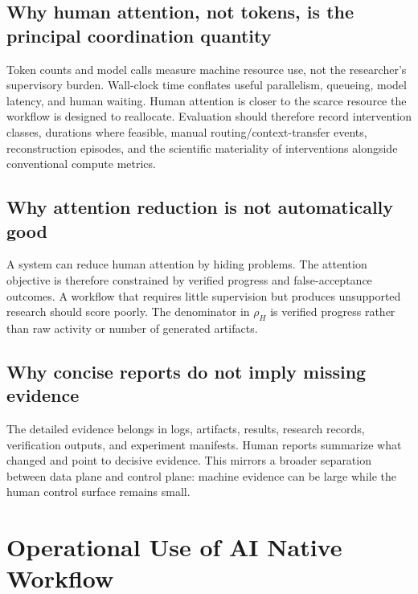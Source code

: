 \documentclass[11pt,a4paper]{article}
\begin{document}
\subsection{Why human attention, not tokens, is the principal coordination quantity}
Token counts and model calls measure machine resource use, not the researcher's supervisory burden. Wall-clock time conflates useful parallelism, queueing, model latency, and human waiting. Human attention is closer to the scarce resource the workflow is designed to reallocate. Evaluation should therefore record intervention classes, durations where feasible, manual routing/context-transfer events, reconstruction episodes, and the scientific materiality of interventions alongside conventional compute metrics.

\subsection{Why attention reduction is not automatically good}
A system can reduce human attention by hiding problems. The attention objective is therefore constrained by verified progress and false-acceptance outcomes. A workflow that requires little supervision but produces unsupported research should score poorly. The denominator in $\rho_H$ is verified progress rather than raw activity or number of generated artifacts.

\subsection{Why concise reports do not imply missing evidence}
The detailed evidence belongs in logs, artifacts, results, research records, verification outputs, and experiment manifests. Human reports summarize what changed and point to decisive evidence. This mirrors a broader separation between data plane and control plane: machine evidence can be large while the human control surface remains small.


\section{Operational Use of AI Native Workflow}\label{sec:operational-use}
\end{document}
